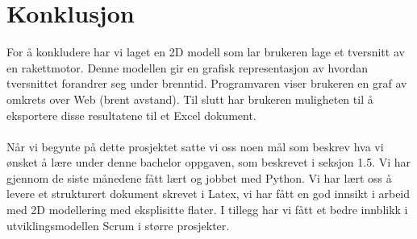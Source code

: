 \chapter{Konklusjon}
\label{chap:conclusion}

For å konkludere har vi laget en 2D modell som lar brukeren lage et tversnitt av en rakettmotor. Denne modellen gir en grafisk representasjon av hvordan tversnittet forandrer seg under brenntid. Programvaren viser brukeren en graf av omkrets over Web (brent avstand). Til slutt har brukeren muligheten til å eksportere disse resultatene til et Excel dokument. \\ \\

Når vi begynte på dette prosjektet satte vi oss noen mål som beskrev hva vi ønsket å lære under denne bachelor oppgaven, som beskrevet i seksjon 1.5. Vi har gjennom de siste månedene fått lært og jobbet med Python. Vi har lært oss å levere et strukturert dokument skrevet i Latex, vi har fått en god innsikt i arbeid med 2D modellering med eksplisitte flater. I tillegg har vi fått et bedre innblikk i utviklingsmodellen Scrum i større prosjekter.

